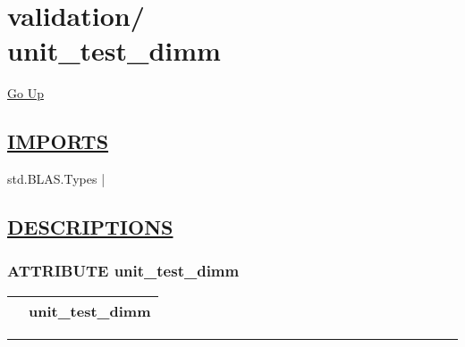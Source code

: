 \chapter*{\color{headfile}
{\large validation\slash\hspace{0pt}}
 \\
unit_test_dimm
}
\hypertarget{ecldoc:toc:validation.unit_test_dimm}{}
\hyperlink{ecldoc:toc:root/validation}{Go Up}

\section*{\underline{\textsf{IMPORTS}}}
\begin{doublespace}
{\large
std.BLAS.Types |
}
\end{doublespace}

\section*{\underline{\textsf{DESCRIPTIONS}}}
\subsection*{\textsf{\colorbox{headtoc}{\color{white} ATTRIBUTE}
unit\_test\_dimm}}

\hypertarget{ecldoc:validation.unit_test_dimm}{}

{\renewcommand{\arraystretch}{1.5}
\begin{tabularx}{\textwidth}{|>{\raggedright\arraybackslash}l|X|}
\hline
\hspace{0pt}\mytexttt{\color{red} } & \textbf{unit\_test\_dimm} \\
\hline
\end{tabularx}
}

\par


\rule{\linewidth}{0.5pt}
